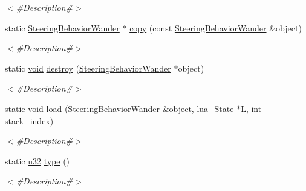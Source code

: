 \begin{DoxyCompactItemize}
\begin{DoxyCompactList}\small\item\em $<$\#\+Description\#$>$ \end{DoxyCompactList}\item 
static \mbox{\hyperlink{classnjli_1_1_steering_behavior_wander}{Steering\+Behavior\+Wander}} $\ast$ \mbox{\hyperlink{classnjli_1_1_steering_behavior_wander_a2ef150a85308d6b6ad785ab7295785c9}{copy}} (const \mbox{\hyperlink{classnjli_1_1_steering_behavior_wander}{Steering\+Behavior\+Wander}} \&object)
\begin{DoxyCompactList}\small\item\em $<$\#\+Description\#$>$ \end{DoxyCompactList}\item 
static \mbox{\hyperlink{_thread_8h_af1e856da2e658414cb2456cb6f7ebc66}{void}} \mbox{\hyperlink{classnjli_1_1_steering_behavior_wander_a1f94bb03833a999228808fbc8f1f2bbc}{destroy}} (\mbox{\hyperlink{classnjli_1_1_steering_behavior_wander}{Steering\+Behavior\+Wander}} $\ast$object)
\begin{DoxyCompactList}\small\item\em $<$\#\+Description\#$>$ \end{DoxyCompactList}\item 
static \mbox{\hyperlink{_thread_8h_af1e856da2e658414cb2456cb6f7ebc66}{void}} \mbox{\hyperlink{classnjli_1_1_steering_behavior_wander_a9e92e32839672b023087658f6ee9c703}{load}} (\mbox{\hyperlink{classnjli_1_1_steering_behavior_wander}{Steering\+Behavior\+Wander}} \&object, lua\+\_\+\+State $\ast$L, int stack\+\_\+index)
\begin{DoxyCompactList}\small\item\em $<$\#\+Description\#$>$ \end{DoxyCompactList}\item 
static \mbox{\hyperlink{_util_8h_a10e94b422ef0c20dcdec20d31a1f5049}{u32}} \mbox{\hyperlink{classnjli_1_1_steering_behavior_wander_a14852ea888647b0acb1a587e9baad28a}{type}} ()
\begin{DoxyCompactList}\small\item\em $<$\#\+Description\#$>$ \end{DoxyCompactList}\end{DoxyCompactItemize}
